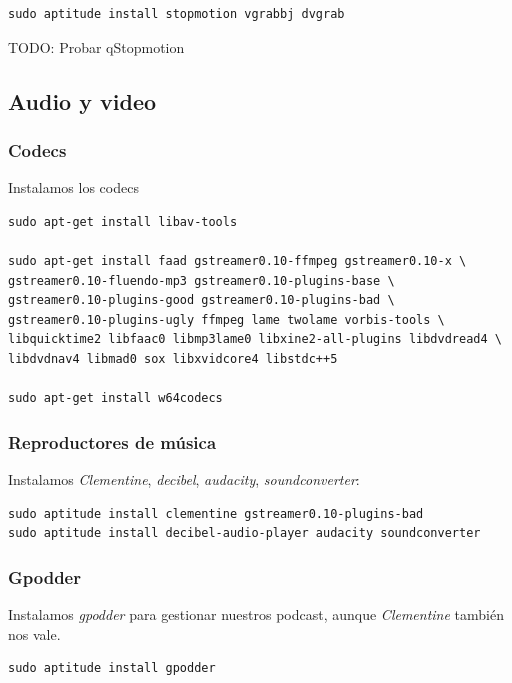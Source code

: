 \documentclass[12pt,spanish,]{article}
\begin{document}
\begin{verbatim}
sudo aptitude install stopmotion vgrabbj dvgrab
\end{verbatim}

TODO: Probar qStopmotion

\subsection{Audio y video}\label{audio-y-video}

\subsubsection{Codecs}\label{codecs}

Instalamos los codecs

\begin{verbatim}
sudo apt-get install libav-tools

sudo apt-get install faad gstreamer0.10-ffmpeg gstreamer0.10-x \
gstreamer0.10-fluendo-mp3 gstreamer0.10-plugins-base \
gstreamer0.10-plugins-good gstreamer0.10-plugins-bad \
gstreamer0.10-plugins-ugly ffmpeg lame twolame vorbis-tools \
libquicktime2 libfaac0 libmp3lame0 libxine2-all-plugins libdvdread4 \
libdvdnav4 libmad0 sox libxvidcore4 libstdc++5

sudo apt-get install w64codecs
\end{verbatim}

\subsubsection{Reproductores de
música}\label{reproductores-de-muxfasica}

Instalamos \emph{Clementine}, \emph{decibel}, \emph{audacity},
\emph{soundconverter}:

\begin{verbatim}
sudo aptitude install clementine gstreamer0.10-plugins-bad
sudo aptitude install decibel-audio-player audacity soundconverter
\end{verbatim}

\subsubsection{Gpodder}\label{gpodder}

Instalamos \emph{gpodder} para gestionar nuestros podcast, aunque
\emph{Clementine} también nos vale.

\begin{verbatim}
sudo aptitude install gpodder
\end{verbatim}
\end{document}
